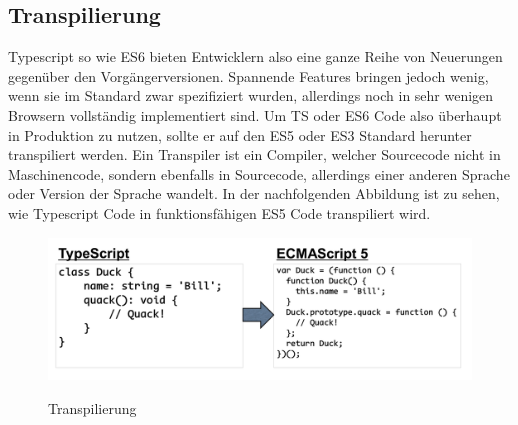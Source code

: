 

\subsection{Transpilierung}

Typescript so wie ES6 bieten Entwicklern also eine ganze Reihe von Neuerungen gegenüber den Vorgängerversionen.
Spannende Features bringen jedoch wenig, wenn sie im Standard zwar spezifiziert wurden,
allerdings noch in sehr wenigen Browsern vollständig implementiert sind.
Um TS oder ES6 Code also überhaupt in Produktion zu nutzen, sollte er auf den ES5 oder ES3
Standard herunter transpiliert werden.
Ein Transpiler ist ein Compiler, welcher Sourcecode nicht in Maschinencode, sondern ebenfalls in Sourcecode,
allerdings einer anderen Sprache oder Version der Sprache wandelt.\cite{Introduction-to-the-Typescript-Transpiler}
In der nachfolgenden Abbildung ist zu sehen, wie Typescript Code in funktionsfähigen ES5 Code transpiliert wird.

\begin{figure}[ht]
 \centering
 \includegraphics[width=0.8\linewidth]{kapitel2/Introduction-transpiler.png}
 \caption{Transpilierung}\cite[27]{ng-Book-2}
\end{figure}
